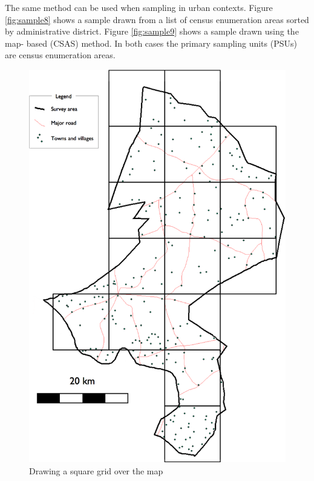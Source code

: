 \documentclass[12pt,]{book}
\theoremstyle{definition}
\theoremstyle{definition}
\theoremstyle{definition}
\theoremstyle{remark}
\begin{document}
The same method can be used when sampling in urban contexts. Figure
\ref{fig:sample8} shows a sample drawn from a list of census enumeration
areas sorted by administrative district. Figure \ref{fig:sample9} shows
a sample drawn using the map- based (CSAS) method. In both cases the
primary sampling units (PSUs) are census enumeration areas.

\begin{figure}[h]

{\centering \includegraphics[width=16.67in]{figures/mapSample2} 

}

\caption{Drawing a square grid over the map}\label{fig:sample6}
\end{figure}
\end{document}
